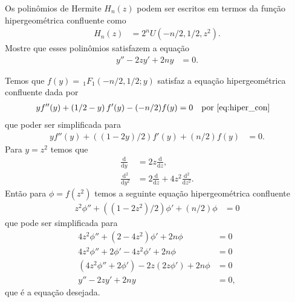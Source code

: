 \documentclass[a4paper,12pt, leqno, answers]{exam}
\begin{document}
\begin{questions}
     Os polinômios de Hermite $H_n(z)$ podem ser escritos em termos da fun\c{c}\~{a}o hipergeom\'{e}trica confluente como
    \begin{align*}
        H_n(z) &= 2^n U(-n/2, 1/2, z^2).
    \end{align*}
    Mostre que esses polin\^{o}mios satisfazem a equa\c{c}\~{a}o
    \begin{align*}
        y'' - 2 zy' + 2ny &= 0.
    \end{align*}
    \begin{solution}
        Temos que $f(y) = \,_1F_1(-n/2, 1/2; y)$ satisfaz a equa\c{c}\~{a}o hipergeom\'{e}trica confluente dada por
        \begin{align*}
            y f''(y) + \left( 1/2 - y \right) f'(y) - (-n/2) f(y) &= 0 && \text{por \eqref{eq:hiper_con}}
        \end{align*}
        que poder ser simplificada para
        \begin{align*}
            y f''(y) + \left( (1 - 2y) / 2 \right) f'(y) + (n/2) f(y) &= 0.
        \end{align*}
        Para $y = z^2$ temos que
        \begin{align*}
            \frac{\mathrm{d}}{\mathrm{d}y} &= 2 z \frac{\mathrm{d}}{\mathrm{d}z}, \\
            \frac{\mathrm{d}^2}{\mathrm{d}y^2} &= 2 \frac{\mathrm{d}}{\mathrm{d}z} + 4 z^2 \frac{\mathrm{d}^2}{\mathrm{d}z^2}.
        \end{align*}
        Ent\~{a}o para $\phi = f(z^2)$ temos a seguinte equa\c{c}\~{a}o hipergeom\'{e}trica confluente
        \begin{align*}
            z^2 \phi'' + \left( (1 - 2z^2)/2 \right) \phi' + (n/2) \phi &= 0
        \end{align*}
        que pode ser simplificada para
        \begin{align*}
            4 z^2 \phi'' + \left( 2 - 4z^2 \right) \phi' + 2n \phi &= 0 \\
            4 z^2 \phi'' + 2 \phi' - 4z^2 \phi' + 2n \phi &= 0 \\
            ( 4 z^2 \phi'' + 2 \phi') - 2 z (2 z \phi') + 2n \phi &= 0 \\
            y'' - 2 z y' + 2n y &= 0,
        \end{align*}
        que \'{e} a equa\c{c}\~{a}o desejada.
    \end{solution}


\end{questions}
\end{document}
